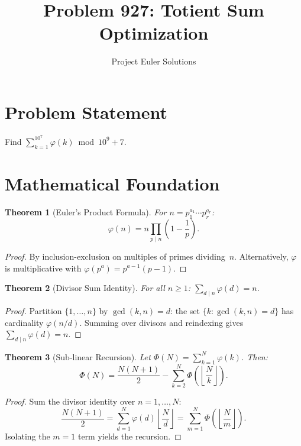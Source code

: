 \documentclass[11pt]{article}
\title{Problem 927: Totient Sum Optimization}
\author{Project Euler Solutions}
\date{}
\newtheorem{theorem}{Theorem}
\theoremstyle{definition}
\begin{document}
\maketitle

\section{Problem Statement}

Find $\sum_{k=1}^{10^7}\varphi(k) \bmod 10^9+7$.

\section{Mathematical Foundation}

\begin{theorem}[Euler's Product Formula]
For $n = p_1^{a_1}\cdots p_r^{a_r}$:
\[
\varphi(n) = n\prod_{p \mid n}\!\left(1 - \frac{1}{p}\right).
\]
\end{theorem}

\begin{proof}
By inclusion-exclusion on multiples of primes dividing~$n$. Alternatively, $\varphi$ is multiplicative with $\varphi(p^a) = p^{a-1}(p-1)$.
\end{proof}

\begin{theorem}[Divisor Sum Identity]
For all $n \geq 1$: $\sum_{d \mid n}\varphi(d) = n$.
\end{theorem}

\begin{proof}
Partition $\{1,\ldots,n\}$ by $\gcd(k,n) = d$: the set $\{k : \gcd(k,n) = d\}$ has cardinality $\varphi(n/d)$. Summing over divisors and reindexing gives $\sum_{d \mid n}\varphi(d) = n$.
\end{proof}

\begin{theorem}[Sub-linear Recursion]
Let $\Phi(N) = \sum_{k=1}^N\varphi(k)$. Then:
\[
\Phi(N) = \frac{N(N+1)}{2} - \sum_{k=2}^{N}\Phi\!\left(\left\lfloor\frac{N}{k}\right\rfloor\right).
\]
\end{theorem}

\begin{proof}
Sum the divisor identity over $n = 1,\ldots,N$:
\[
\frac{N(N+1)}{2} = \sum_{d=1}^N \varphi(d)\left\lfloor\frac{N}{d}\right\rfloor = \sum_{m=1}^N \Phi\!\left(\left\lfloor\frac{N}{m}\right\rfloor\right).
\]
Isolating the $m=1$ term yields the recursion.
\end{proof}
\end{document}

